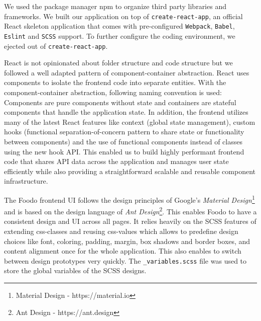We used the package manager \gls{npm} to organize third party libraries and frameworks. We built our application on top of \texttt{create-react-app}, an official React skeleton application that comes with pre-configured \texttt{Webpack}, \texttt{Babel}, \texttt{Eslint} and \texttt{SCSS} support. To further configure the coding environment, we ejected out of \texttt{create-react-app}.


React is not opinionated about folder structure and code structure but we followed a well adapted pattern of component-container abstraction. React uses components to isolate the frontend code into separate entities. With the component-container abstraction, following naming convention is used: Components are pure components without state and containers are stateful components that handle the application state. In addition, the frontend utilizes many of the latest React features like context (global state management), custom hooks (functional separation-of-concern pattern to share state or functionality between components) and the use of functional components instead of classes using the new hook API. This enabled us to build highly performant frontend code that shares API data across the application and manages user state efficiently while also providing a straightforward scalable and reusable component infrastructure. 


The Foodo frontend UI follows the design principles of Google’s \textit{Material Design}\footnote{Material Design - https://material.io} and is based on the design language of \textit{Ant Design}\footnote{Ant Design - https://ant.design}. This enables Foodo to have a consistent design and UI across all pages. It relies heavily on the SCSS features of extending css-classes and reusing css-values which allows to predefine design choices like font, coloring, padding, margin, box shadows and border boxes, and content alignment once for the whole application. This also enables to switch between design prototypes very quickly. The \texttt{\_variables.scss} file was used to store the global variables of the SCSS designs. 

